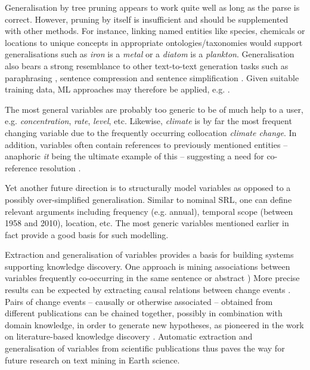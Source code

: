 \documentclass[11pt]{article}
\begin{document}
Generalisation by tree pruning appears to work quite well as long as the parse is correct.
However, pruning by itself is insufficient and should be supplemented with other methods.
For instance, linking named entities like species, chemicals or locations to unique concepts in appropriate ontologies/taxonomies would support generalisations such as \emph{iron} is a \emph{metal} or a \emph{diatom} is a \emph{plankton}. 
Generalisation also bears a strong resemblance to other text-to-text generation tasks such as paraphrasing \cite{AndroutsopoulosMalakasiotis:2010}, sentence compression \cite{jing2000sentence} and sentence simplification \cite{shardlow2014survey}.
Given suitable training data,  ML approaches may therefore be applied, e.g. \cite{knight2002,CohnLapata:2009}.


The most general variables are probably too generic to be of much help to a user, e.g. \emph{concentration}, \emph{rate}, \emph{level}, etc.
Likewise, \emph{climate} is by far the most frequent changing variable due to the frequently occurring collocation \emph{climate change}.
In addition, variables often contain references to previously mentioned entities -- anaphoric \emph{it} being the ultimate example of this -- suggesting a need for co-reference resolution \cite{Miwa01072012}.

Yet another future direction is to structurally model variables as opposed to a possibly over-simplified generalisation. 
Similar to nominal SRL, one can define relevant arguments including frequency (e.g.
annual), temporal scope (between 1958 and 2010), location, etc.
The most generic variables mentioned earlier in fact provide a good basis for such modelling.

Extraction and generalisation of variables provides a basis for building systems supporting knowledge discovery.
One approach is mining associations between variables frequently co-occurring in the same sentence or abstract \cite{Jenssen:2001aa,Hashimoto2012Excitatory}) 
More precise results can be expected by extracting causal relations between change events \cite{chang2005causal,blanco2008causal,Raja2013PPInterFindera}.
Pairs of change events -- causally or otherwise associated -- obtained from different publications can be chained together, possibly in combination with domain knowledge, in order to generate new hypotheses, as pioneered in the work on literature-based knowledge discovery \cite{Swanson1986Fish,Swa88,Swanson1997Interactive}.
Automatic extraction and generalisation of variables from scientific publications thus paves the way for future research on text mining in Earth science.
 
\end{document}
